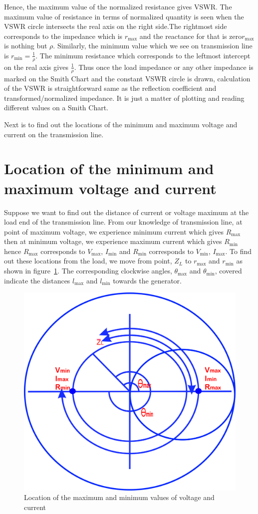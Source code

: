 Hence, the maximum value of the normalized resistance gives VSWR. The maximum value of resistance in terms of normalized quantity is seen when the VSWR circle intersects the real axis on the right side.The rightmost side corresponds to the impedance which is $r_\max$ and the reactance for that is zero\textemdash\;$r_\max$ is nothing but $\rho$. Similarly, the minimum value which we see on transmission line is $r_\min = \frac{1}{\rho}$. The minimum resistance which corresponds to the leftmost intercept on the real axis gives $\frac{1}{\rho}$. Thus once the load impedance or any other impedance is marked on the Smith Chart and the constant VSWR circle is drawn, calculation of the VSWR is straightforward same as the reflection coefficient and transformed/normalized impedance. It is just a matter of plotting and reading different values on a Smith Chart.

Next is to find out the locations of the  minimum and maximum voltage and current on the transmission line. 

\section{Location of the minimum and maximum voltage and current}
Suppose we want to find out the distance of current or voltage maximum at the load end of the transmission line. From our knowledge of transmission line, at point of maximum voltage, we experience minimum current which gives $R_\max$ then at minimum voltage, we experience maximum current which gives $R_\min$ hence $R_\max$ corresponds to $V_\max$,  $I_\min$ and  $R_\min$ corresponds to  $V_\min$, $I_\max$.  To find out these locations from the load, we move from point, $Z_L$ to $r_\max$ and $r_\min$ as shown in figure~\ref{fig:lkjtresx}. The corresponding clockwise angles, $\theta_\max$ and $\theta_\min$, covered indicate the distances $l_\max$ and $l_\min$ towards the generator.
\begin{figure}[h]
\centering
\includegraphics[width=0.7\linewidth]{./graphics/lkjtresx}
\caption{Location of the maximum and minimum values of voltage and current}
\label{fig:lkjtresx}
\end{figure}

